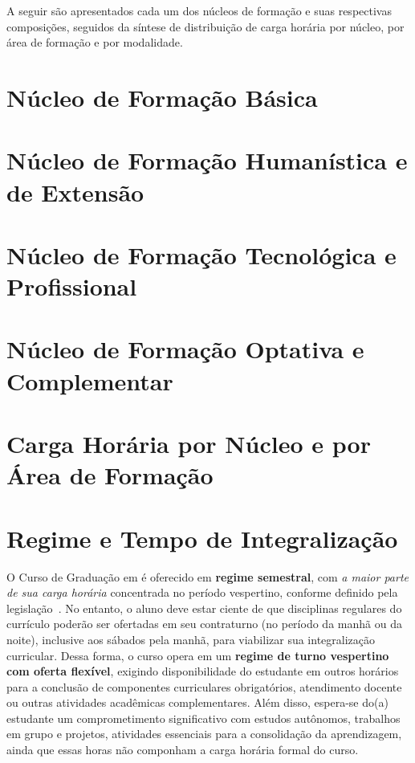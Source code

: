 A seguir são apresentados cada um dos núcleos de formação e suas respectivas composições, seguidos da síntese de distribuição de carga horária por núcleo, por área de formação e por modalidade.

\section{Núcleo de Formação Básica}


\section{Núcleo de Formação Humanística e de Extensão}


\section{Núcleo de Formação Tecnológica e Profissional}


\section{Núcleo de Formação Optativa e Complementar}


\section{Carga Horária por Núcleo e por Área de Formação}




\section{Regime e Tempo de Integralização}
\label{sec:regime}

O Curso de Graduação em \ppccurso é oferecido em \textbf{regime semestral}, com \textit{a maior parte de sua carga horária} concentrada no período vespertino, conforme definido pela legislação~\cite{mec_portaria_21_2017}. No entanto, o aluno deve estar ciente de que disciplinas regulares do currículo poderão ser ofertadas em seu contraturno (no período da manhã ou da noite), inclusive aos sábados pela manhã, para viabilizar sua integralização curricular. Dessa forma, o curso opera em um \textbf{regime de turno vespertino com oferta flexível}, exigindo disponibilidade do estudante em outros horários para a conclusão de componentes curriculares obrigatórios, atendimento docente ou outras atividades acadêmicas complementares. Além disso, espera-se do(a) estudante um comprometimento significativo com estudos autônomos, trabalhos em grupo e projetos, atividades essenciais para a consolidação da aprendizagem, ainda que essas horas não componham a carga horária formal do curso.

